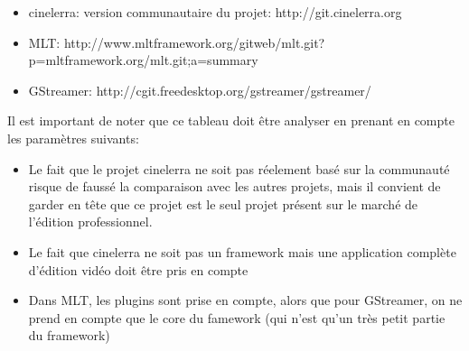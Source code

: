 \begin{itemize}

  \item {cinelerra: version communautaire du projet:
  http://git.cinelerra.org }

  \item {MLT:
http://www.mltframework.org/gitweb/mlt.git?p=mltframework.org/mlt.git;a=summary}

  \item {GStreamer: http://cgit.freedesktop.org/gstreamer/gstreamer/ }

\end{itemize}

Il est important de noter que ce tableau doit être analyser en prenant
en compte les paramètres suivants:

\begin{itemize}

  \item {Le fait que le projet cinelerra ne soit pas réelement basé
  sur la communauté
    risque de faussé la comparaison avec les autres projets, mais il
    convient de garder en tête que ce projet est le seul projet présent
    sur le marché de l'édition professionnel.}


  \item {Le fait que cinelerra ne soit pas un framework mais une
    application complète d'édition vidéo doit être pris en compte}

  \item {Dans MLT, les plugins sont prise en compte, alors que pour
    GStreamer, on ne prend en compte que le core du famework (qui n'est
    qu'un très petit partie du framework)}

\end{itemize}

